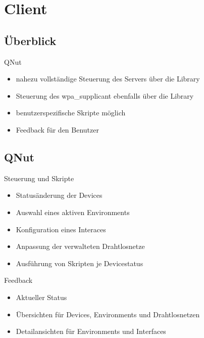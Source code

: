 
\section{Client}
\subsection{Überblick}
\begin{frame}[<+-| alert@+>]{QNut}
	\begin{itemize}
		\item nahezu vollständige Steuerung des Servers über die Library
		\item Steuerung des wpa\_supplicant ebenfalls über die Library
		\item benutzerspezifische Skripte möglich
		\item Feedback für den Benutzer
	\end{itemize}
\end{frame}

\subsection{QNut}
\begin{frame}[<+-| alert@+>]{Steuerung und Skripte}
	\begin{itemize}
		\item Statusänderung der Devices
		\item Auswahl eines aktiven Environments
		\item Konfiguration eines Interaces
		\item Anpassung der verwalteten Drahtlosnetze
		\item Ausführung von Skripten je Devicestatus
	\end{itemize}
\end{frame}

\begin{frame}[<+-| alert@+>]{Feedback}
	\begin{itemize}
		\item Aktueller Status
		\item Übersichten für Devices, Environments und Drahtlosnetzen
		\item Detailansichten für Environments und Interfaces
	\end{itemize}
\end{frame}

